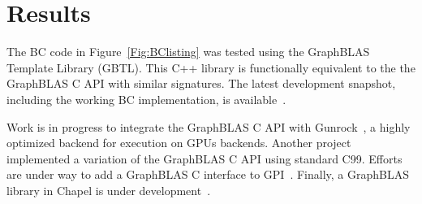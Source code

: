 \section{Results}
\label{sec:results}

The BC code in Figure~\ref{Fig:BClisting} 
was tested using the GraphBLAS Template Library (GBTL)\cite{gbtl-cuda16}. This 
C++ library is functionally equivalent to the the GraphBLAS C
API with similar signatures.  The latest development snapshot, 
including the working BC implementation, is available~\cite{gbtl-github}. 

Work is in progress to integrate the GraphBLAS C API 
with Gunrock~\cite{topc17}, a highly optimized backend for execution 
on GPUs backends.  Another project~\cite{cook} implemented a variation
of the GraphBLAS C API using standard C99.
Efforts are under way to add a GraphBLAS C interface to GPI~\cite{gpi2016}.
Finally, a GraphBLAS library in Chapel is under development~\cite{chiuw17}.

